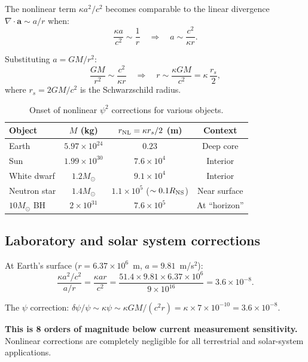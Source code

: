 \documentclass[11pt]{article}
\newcommand{\ee}[1]{\times 10^{#1}}
\begin{document}
The nonlinear term $\kappa a^2/c^2$ becomes comparable to the linear
divergence $\nabla\cdot\mathbf{a} \sim a/r$ when:
\begin{equation}
\frac{\kappa a}{c^2} \sim \frac{1}{r}
\quad\Rightarrow\quad
a \sim \frac{c^2}{\kappa r}.
\end{equation}

Substituting $a = GM/r^2$:
\begin{equation}
\frac{GM}{r^2} \sim \frac{c^2}{\kappa r}
\quad\Rightarrow\quad
r \sim \frac{\kappa GM}{c^2} = \kappa\,\frac{r_s}{2},
\end{equation}
where $r_s = 2GM/c^2$ is the Schwarzschild radius.

\begin{table}[H]
\centering
\caption{Onset of nonlinear $\psi^2$ corrections for various objects.}
\begin{tabular}{@{}lccc@{}}
\toprule
Object & $M$ (kg) & $r_{\rm NL} = \kappa r_s/2$ (m) & Context \\
\midrule
Earth & $5.97\ee{24}$ & $0.23$ & Deep core \\
Sun & $1.99\ee{30}$ & $7.6\ee{4}$ & Interior \\
White dwarf & $1.2 M_\odot$ & $9.1\ee{4}$ & Interior \\
Neutron star & $1.4 M_\odot$ & $1.1\ee{5}$ ($\sim 0.1 R_{\rm NS}$) & Near surface \\
$10 M_\odot$ BH & $2\ee{31}$ & $7.6\ee{5}$ & At ``horizon'' \\
\bottomrule
\end{tabular}
\end{table}

\subsection{Laboratory and solar system corrections}

At Earth's surface ($r = 6.37\ee{6}$~m, $a = 9.81$~m/s$^2$):
\begin{equation}
\frac{\kappa a^2/c^2}{a/r} = \frac{\kappa a r}{c^2}
= \frac{51.4 \times 9.81 \times 6.37\ee{6}}{9\ee{16}}
= 3.6\ee{-8}.
\end{equation}

The $\psi$ correction: $\delta\psi/\psi \sim \kappa\psi \sim
\kappa GM/(c^2 r) = \kappa \times 7\ee{-10} = 3.6\ee{-8}$.

\textbf{This is 8 orders of magnitude below current measurement
sensitivity.} Nonlinear corrections are completely negligible for
all terrestrial and solar-system applications.
\end{document}
